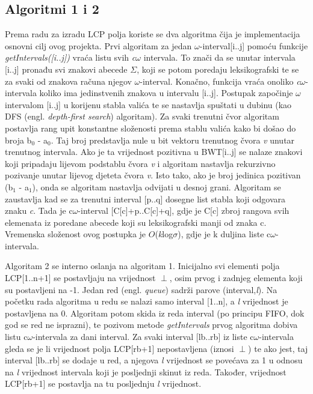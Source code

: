 \documentclass[a4paper,12pt]{article}
\begin{document}

\subsection{Algoritmi 1 i 2}

Prema radu \cite{beller2013} za izradu LCP polja koriste se dva algoritma čija je implementacija osnovni cilj ovog projekta. 
Prvi algoritam za jedan $\omega$-interval[i..j] pomoću funkcije \textit{getIntervals([i..j])} vraća listu svih \textit{c$\omega$} intervala. To znači da se unutar intervala [i..j] pronađu svi znakovi abecede $\Sigma$, koji se potom poredaju leksikografski te se za svaki od znakova računa njegov $\omega$-interval. Konačno, funkcija vraća onoliko \textit{c$\omega$}-intervala koliko ima jedinstvenih znakova u intervalu [i..j].
Postupak započinje $\omega$ intervalom [i..j] u korijenu stabla valića te se nastavlja spuštati u dubinu (kao DFS (engl. \textit{depth-first search}) algoritam).
Za svaki trenutni čvor algoritam postavlja rang upit konstantne složenosti prema stablu valića kako bi došao do broja b$_{0}$ - a$_{0}$. Taj broj predstavlja nule u bit vektoru trenutnog čvora \textit{v} unutar trenutnog intervala. Ako je ta vrijednost pozitivna u BWT[i..j] se nalaze znakovi koji pripadaju lijevom podstablu čvora \textit{v} i algoritam nastavlja rekurzivno pozivanje unutar lijevog djeteta čvora \textit{v}. Isto tako, ako je broj jedinica pozitivan (b$_1$ - a$_1$), onda se algoritam nastavlja odvijati u desnoj grani. Algoritam se zaustavlja kad se za trenutni interval [p..q] dosegne list stabla koji odgovara znaku \textit{c}. Tada je c$\omega$-interval [C[c]+p..C[c]+q], gdje je C[c] zbroj rangova svih elemenata iz poredane abecede koji su leksikografski manji od znaka c. Vremenska složenost ovog postupka je $O$(\textit{k}log$\sigma$), gdje je k duljina liste c$\omega$-intervala.

Algoritam 2 se interno oslanja na algoritam 1. Inicijalno svi elementi polja LCP[1..n+1] se postavljaju na vrijednost  $\perp$, osim prvog i zadnjeg elementa koji su postavljeni na -1.  Jedan red (engl. \textit{queue}) sadrži parove (interval,\textit{l}).
 Na početku rada algoritma u redu se nalazi samo interval [1..n], a \textit{l} vrijednost je postavljena na 0. Algoritam potom skida iz reda interval (po principu FIFO, dok god se red ne isprazni), te pozivom metode \textit{getIntervals} prvog algoritma dobiva listu c$\omega$-intervala za dani interval. Za svaki interval [lb..rb] iz liste c$\omega$-intervala gleda se je li vrijednost polja LCP[rb+1] nepostavljena (iznosi $\perp$) te ako jest, taj interval [lb..rb] se dodaje u red, a njegova \textit{l} vrijednost se povećava za 1 u odnosu na \textit{l} vrijednost intervala koji je posljednji skinut iz reda. Također, vrijednost LCP[rb+1] se postavlja na tu posljednju \textit{l} vrijednost. 
\end{document}
